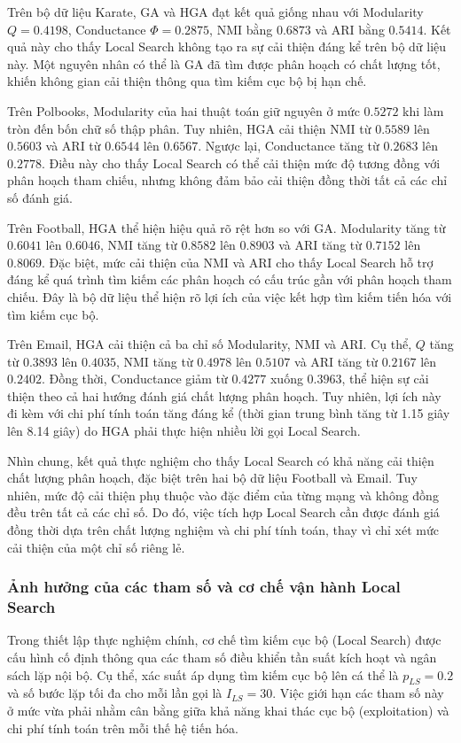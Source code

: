 \documentclass[14pt,a4paper]{extarticle}
\begin{document}
Trên bộ dữ liệu Karate, GA và HGA đạt kết quả giống nhau với Modularity $Q = 0.4198$, Conductance $\Phi = 0.2875$, NMI bằng $0.6873$ và ARI bằng $0.5414$. Kết quả này cho thấy Local Search không tạo ra sự cải thiện đáng kể trên bộ dữ liệu này. Một nguyên nhân có thể là GA đã tìm được phân hoạch có chất lượng tốt, khiến không gian cải thiện thông qua tìm kiếm cục bộ bị hạn chế.

Trên Polbooks, Modularity của hai thuật toán giữ nguyên ở mức $0.5272$ khi làm tròn đến bốn chữ số thập phân. Tuy nhiên, HGA cải thiện NMI từ $0.5589$ lên $0.5603$ và ARI từ $0.6544$ lên $0.6567$. Ngược lại, Conductance tăng từ $0.2683$ lên $0.2778$. Điều này cho thấy Local Search có thể cải thiện mức độ tương đồng với phân hoạch tham chiếu, nhưng không đảm bảo cải thiện đồng thời tất cả các chỉ số đánh giá.

Trên Football, HGA thể hiện hiệu quả rõ rệt hơn so với GA. Modularity tăng từ $0.6041$ lên $0.6046$, NMI tăng từ $0.8582$ lên $0.8903$ và ARI tăng từ $0.7152$ lên $0.8069$. Đặc biệt, mức cải thiện của NMI và ARI cho thấy Local Search hỗ trợ đáng kể quá trình tìm kiếm các phân hoạch có cấu trúc gần với phân hoạch tham chiếu. Đây là bộ dữ liệu thể hiện rõ lợi ích của việc kết hợp tìm kiếm tiến hóa với tìm kiếm cục bộ.

Trên Email, HGA cải thiện cả ba chỉ số Modularity, NMI và ARI. Cụ thể, $Q$ tăng từ $0.3893$ lên $0.4035$, NMI tăng từ $0.4978$ lên $0.5107$ và ARI tăng từ $0.2167$ lên $0.2402$. Đồng thời, Conductance giảm từ $0.4277$ xuống $0.3963$, thể hiện sự cải thiện theo cả hai hướng đánh giá chất lượng phân hoạch. Tuy nhiên, lợi ích này đi kèm với chi phí tính toán tăng đáng kể (thời gian trung bình tăng từ 1.15 giây lên 8.14 giây) do HGA phải thực hiện nhiều lời gọi Local Search.

Nhìn chung, kết quả thực nghiệm cho thấy Local Search có khả năng cải thiện chất lượng phân hoạch, đặc biệt trên hai bộ dữ liệu Football và Email. Tuy nhiên, mức độ cải thiện phụ thuộc vào đặc điểm của từng mạng và không đồng đều trên tất cả các chỉ số. Do đó, việc tích hợp Local Search cần được đánh giá đồng thời dựa trên chất lượng nghiệm và chi phí tính toán, thay vì chỉ xét mức cải thiện của một chỉ số riêng lẻ.

\subsubsection{Ảnh hưởng của các tham số và cơ chế vận hành Local Search}

Trong thiết lập thực nghiệm chính, cơ chế tìm kiếm cục bộ (Local Search) được cấu hình cố định thông qua các tham số điều khiển tần suất kích hoạt và ngân sách lặp nội bộ. Cụ thể, xác suất áp dụng tìm kiếm cục bộ lên cá thể là $p_{LS} = 0.2$ và số bước lặp tối đa cho mỗi lần gọi là $I_{LS} = 30$. Việc giới hạn các tham số này ở mức vừa phải nhằm cân bằng giữa khả năng khai thác cục bộ (exploitation) và chi phí tính toán trên mỗi thế hệ tiến hóa.
\end{document}
